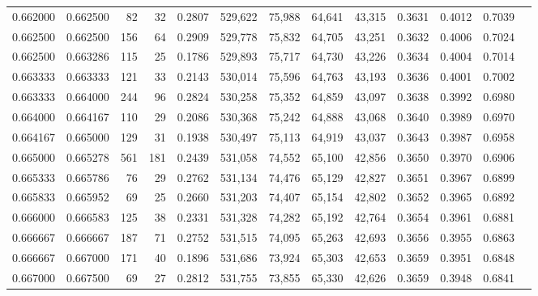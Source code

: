 \begin{tabular}{rrrrrrrrrrrrr}
0.662000 & 0.662500 &    82 &  32 &                                     0.2807 & 529,622 &  75,988 &  64,641 &  43,315 & 0.3631 & 0.4012 & 0.7039 \\
0.662500 & 0.662500 &   156 &  64 &                                     0.2909 & 529,778 &  75,832 &  64,705 &  43,251 & 0.3632 & 0.4006 & 0.7024 \\
0.662500 & 0.663286 &   115 &  25 &                                     0.1786 & 529,893 &  75,717 &  64,730 &  43,226 & 0.3634 & 0.4004 & 0.7014 \\
0.663333 & 0.663333 &   121 &  33 &                                     0.2143 & 530,014 &  75,596 &  64,763 &  43,193 & 0.3636 & 0.4001 & 0.7002 \\
0.663333 & 0.664000 &   244 &  96 &                                     0.2824 & 530,258 &  75,352 &  64,859 &  43,097 & 0.3638 & 0.3992 & 0.6980 \\
0.664000 & 0.664167 &   110 &  29 &                                     0.2086 & 530,368 &  75,242 &  64,888 &  43,068 & 0.3640 & 0.3989 & 0.6970 \\
0.664167 & 0.665000 &   129 &  31 &                                     0.1938 & 530,497 &  75,113 &  64,919 &  43,037 & 0.3643 & 0.3987 & 0.6958 \\
0.665000 & 0.665278 &   561 & 181 &                                     0.2439 & 531,058 &  74,552 &  65,100 &  42,856 & 0.3650 & 0.3970 & 0.6906 \\
0.665333 & 0.665786 &    76 &  29 &                                     0.2762 & 531,134 &  74,476 &  65,129 &  42,827 & 0.3651 & 0.3967 & 0.6899 \\
0.665833 & 0.665952 &    69 &  25 &                                     0.2660 & 531,203 &  74,407 &  65,154 &  42,802 & 0.3652 & 0.3965 & 0.6892 \\
0.666000 & 0.666583 &   125 &  38 &                                     0.2331 & 531,328 &  74,282 &  65,192 &  42,764 & 0.3654 & 0.3961 & 0.6881 \\
0.666667 & 0.666667 &   187 &  71 &                                     0.2752 & 531,515 &  74,095 &  65,263 &  42,693 & 0.3656 & 0.3955 & 0.6863 \\
0.666667 & 0.667000 &   171 &  40 &                                     0.1896 & 531,686 &  73,924 &  65,303 &  42,653 & 0.3659 & 0.3951 & 0.6848 \\
0.667000 & 0.667500 &    69 &  27 &                                     0.2812 & 531,755 &  73,855 &  65,330 &  42,626 & 0.3659 & 0.3948 & 0.6841 \\

\end{tabular}
